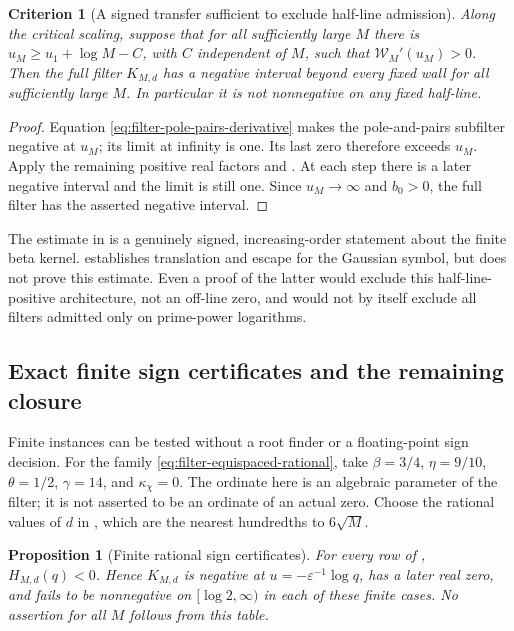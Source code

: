 \documentclass[11pt]{article}
\newtheorem{proposition}[theorem]{Proposition}
\newtheorem{criterion}[theorem]{Criterion}
\theoremstyle{definition}
\theoremstyle{remark}
\begin{document}
\begin{criterion}[A signed transfer sufficient to exclude half-line admission]
\label{crit:filter-signed-transfer}
Along the critical scaling, suppose that for all sufficiently large
$M$ there is $u_M\ge u_1+\log M-C$, with $C$ independent of $M$,
such that $\mathscr W_M'(u_M)>0$.  Then the full filter
$K_{M,d}$ has a negative interval beyond every fixed wall for all
sufficiently large $M$.  In particular it is not nonnegative on any
fixed half-line.
\end{criterion}

\begin{proof}
Equation \eqref{eq:filter-pole-pairs-derivative} makes the
pole-and-pairs subfilter negative at $u_M$; its limit at infinity is
one.  Its last zero therefore exceeds $u_M$.  Apply the remaining
positive real factors and .
At each step there is a later negative interval and the limit is
still one.  Since $u_M\to\infty$ and $b_0>0$, the full filter has the
asserted negative interval.
\end{proof}

The estimate in  is a genuinely
signed, increasing-order statement about the finite beta kernel.
 establishes translation and escape
for the Gaussian symbol, but does not prove this estimate.  Even a
proof of the latter would exclude this half-line-positive architecture,
not an off-line zero, and would not by itself exclude all filters
admitted only on prime-power logarithms.

\subsection{Exact finite sign certificates and the remaining closure}
\label{subsec:filter-finite-certificates}

Finite instances can be tested without a root finder or a floating-point
sign decision.  For the family \eqref{eq:filter-equispaced-rational},
take $\beta=3/4$, $\eta=9/10$, $\theta=1/2$, $\gamma=14$, and
$\kappa_\chi=0$.  The ordinate here is an algebraic parameter of the
filter; it is not asserted to be an ordinate of an actual zero.
Choose the rational values of $d$ in ,
which are the nearest hundredths to $6\sqrt M$.

\begin{proposition}[Finite rational sign certificates]
\label{prop:filter-finite-signs}
For every row of ,
$H_{M,d}(q)<0$.  Hence $K_{M,d}$ is negative at
$u=-\varepsilon^{-1}\log q$, has a later real zero, and fails to be
nonnegative on $[\log2,\infty)$ in each of these finite cases.
No assertion for all $M$ follows from this table.
\end{proposition}
\end{document}
